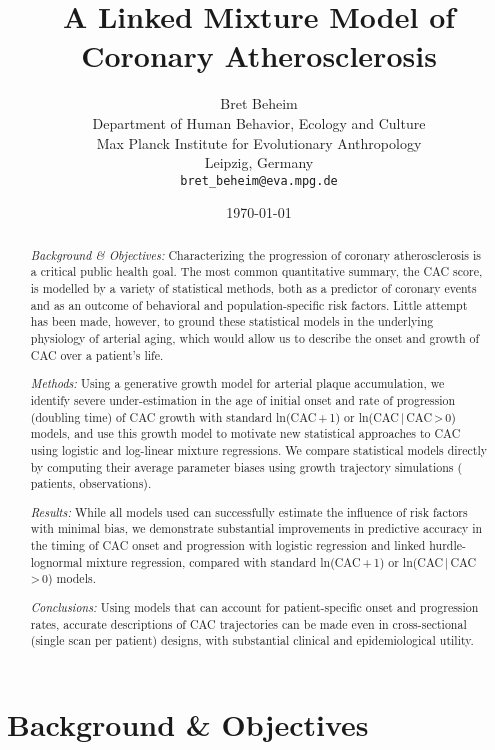 \documentclass[a4paper, 10pt]{article}
\title{A Linked Mixture Model of Coronary Atherosclerosis}
\date{\today}  %
\author{
  Bret Beheim\\
  Department of Human Behavior, Ecology and Culture\\
  Max Planck Institute for Evolutionary Anthropology\\
  Leipzig, Germany\\
  \texttt{bret\_beheim@eva.mpg.de}\\
}
\begin{document}
\maketitle

\begin{abstract}
\textit{Background \& Objectives:} Characterizing the progression of coronary atherosclerosis is a critical public health goal. The most common quantitative summary, the CAC score, is modelled by a variety of statistical methods, both as a predictor of coronary events and as an outcome of behavioral and population-specific risk factors. Little attempt has been made, however, to ground these statistical models in the underlying physiology of arterial aging, which would allow us to describe the onset and growth of CAC over a patient's life.

\textit{Methods:} Using a generative growth model for arterial plaque accumulation, we identify severe under-estimation in the age of initial onset and rate of progression (doubling time) of CAC growth with standard ln(CAC\,+\,1) or ln(CAC\,|\,CAC\,>\,0) models, and use this growth model to motivate new statistical approaches to CAC using logistic and log-linear mixture regressions. We compare statistical models directly by computing their average parameter biases using \numStudies{} growth trajectory simulations (\numPatients{} patients, \numObservations{} observations).

\textit{Results:} While all models used can successfully estimate the influence of risk factors with minimal bias, we demonstrate substantial improvements in predictive accuracy in the timing of CAC onset and progression with logistic regression and linked hurdle-lognormal mixture regression, compared with standard ln(CAC\,+\,1) or ln(CAC\,|\,CAC\,>\,0) models.

\textit{Conclusions:} Using models that can account for patient-specific onset and progression rates, accurate descriptions of CAC trajectories can be made even in cross-sectional (single scan per patient) designs, with substantial clinical and epidemiological utility.
\end{abstract}


\section{Background \& Objectives}
\end{document}

